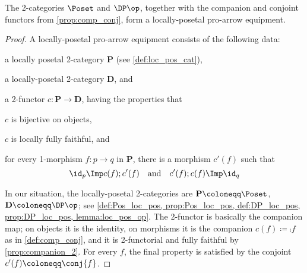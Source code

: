 \begin{theorem}
The 2-categories $\Poset$ and $\DP\op$, together with the companion and conjoint functors from \cref{prop:comp_conj}, form a locally-posetal pro-arrow equipment.
\end{theorem}
\begin{proof}
A locally-posetal pro-arrow equipment consists of the following data:
\begin{compactitem}
	\item a locally posetal 2-category $\mathbf{P}$ (see \cref{def:loc_pos_cat}),
	\item a locally-posetal 2-category $\mathbf{D}$, and
	\item a 2-functor $c\colon\mathbf{P}\to\mathbf{D}$, having the properties that
	\begin{compactitem}
		\item $c$ is bijective on objects,
		\item $c$ is locally fully faithful, and
		\item for every 1-morphism $f\colon p\to q$ in $\mathbf{P}$, there is a morphism $c'(f)$ such that
		\[\id_p\Imp c(f);c'(f)\quad\text{and}\quad c'(f);c(f)\Imp\id_q\]
	\end{compactitem}
\end{compactitem}
In our situation, the locally-posetal 2-categories are $\mathbf{P}\coloneqq\Poset$, $\mathbf{D}\coloneqq\DP\op$; see \cref{def:Pos_loc_pos, prop:Pos_loc_pos, def:DP_loc_pos, prop:DP_loc_pos, lemma:loc_pos_op}. The 2-functor is basically the companion map; on objects it is the identity, on morphisms it is the companion $c(f)\coloneqq\comp{f}$ as in \cref{def:comp_conj}, and it is 2-functorial and fully faithful by \cref{prop:companion_2}. For every $f$, the final property is satisfied by the conjoint $c'(f)\coloneqq \conj{f}$.
\end{proof}


